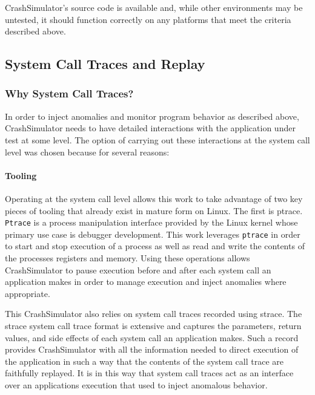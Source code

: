     CrashSimulator's source code is available and, while other environments may
    be untested, it should function correctly on any platforms that meet the
    criteria described above.

    \subsection{System Call Traces and Replay}

        \subsubsection{Why System Call Traces?}

        In order to inject anomalies and monitor program behavior as described
        above, CrashSimulator needs to have detailed interactions with the
        application under test at some level.  The option of carrying out these
        interactions at the system call level was chosen because for several
        reasons:

        \paragraph{Tooling}

        Operating at the system call level allows this work to take advantage of
        two key pieces of tooling that already exist in mature form on Linux.
        The first is ptrace. {\tt Ptrace} is a process manipulation interface provided
        by the Linux kernel whose primary use case is debugger development.
        This work leverages {\tt ptrace} in order to start and stop execution of a
        process as well as read and write the contents of the processes
        registers and memory.  Using these operations allows CrashSimulator to
        pause execution before and after each system call an application makes
        in order to manage execution and inject anomalies where appropriate.

        This CrashSimulator also relies on system call traces recorded using
        strace.  The strace system call trace format is extensive and captures
        the parameters, return values, and side effects of each system call an
        application makes.  Such a record provides CrashSimulator with all the
        information needed to direct execution of the application in such a way
        that the contents of the system call trace are faithfully replayed.  It
        is in this way that system call traces act as an interface over an
        applications execution that used to inject anomalous behavior.

